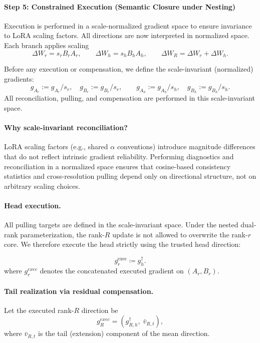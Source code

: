 \documentclass{article}
\begin{document}
\paragraph{Step 5: Constrained Execution (Semantic Closure under Nesting)}

Execution is performed in a scale-normalized gradient space
to ensure invariance to LoRA scaling factors. All directions are now interpreted in normalized space.
Each branch applies scaling
\[
\Delta W_r = s_r B_r A_r,
\qquad
\Delta W_h = s_h B_h A_h,
\qquad
\Delta W_R = \Delta W_r + \Delta W_h.
\]

Before any execution or compensation, we define the scale-invariant (normalized) gradients:
\[
g_{A_r} := g_{A_r}/s_r,\quad
g_{B_r} := g_{B_r}/s_r,
\qquad
g_{A_h} := g_{A_h}/s_h,\quad
g_{B_h} := g_{B_h}/s_h.
\]
All reconciliation, pulling, and compensation are performed in this scale-invariant space.


\paragraph{Why scale-invariant reconciliation?}
LoRA scaling factors (e.g., shared $\alpha$ conventions)
introduce magnitude differences that do not reflect
intrinsic gradient reliability.
Performing diagnostics and reconciliation in a normalized space
ensures that cosine-based consistency statistics
and cross-resolution pulling depend only on directional structure,
not on arbitrary scaling choices.


\paragraph{Head execution.}
All pulling targets are defined in the scale-invariant space.
Under the nested dual-rank parameterization, the rank-$R$ update is not allowed to overwrite the rank-$r$ core.
We therefore execute the head strictly using the trusted head direction:

\[
g_r^{\mathrm{exec}} \coloneqq g_h^\dagger.
\]
where $g_r^{exec}$ denotes the concatenated executed gradient on $(A_r,B_r)$.

\paragraph{Tail realization via residual compensation.}
Let the executed rank-$R$ direction be
\[
g_R^{exec} = (g_{R,h}^\dagger,\; \bar v_{R,t}),
\]
where $\bar v_{R,t}$ is the tail (extension) component of the mean direction.
\end{document}
